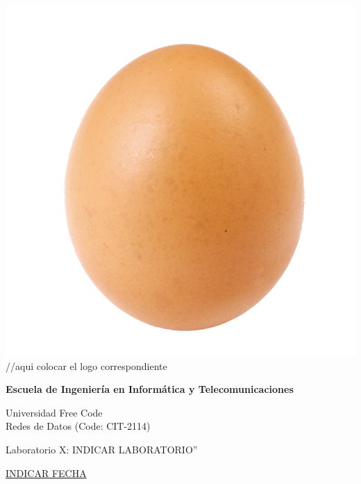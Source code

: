 \documentclass[11pt,paper=letterpaper,answers]{exam}
\begin{document}
\noindent
\begin{minipage}[l]{.1\textwidth}%
\noindent
\includegraphics[scale = 0.1]{huevo.png} //aqui colocar el logo correspondiente
\end{minipage}
\hfill
\begin{minipage}[l]{0.9\textwidth}%
\begin{center}
{\Large \bfseries Escuela de Ingenier\'ia en Inform\'atica y Telecomunicaciones \par
\Large Universidad Free Code \\[2pt]
\large Redes de Datos {(\small Code: CIT-2114)}  \par
\vspace{0.2cm}
\Large Laboratorio X: INDICAR LABORATORIO” \par}
\vspace{0.0cm}
\end{center}
\end{minipage}

\vspace{0.5cm}
\par
\noindent
\uline{\normalsize {INDICAR FECHA} \hfill \footnotesize {} \hfill \footnotesize {}}
\end{document}
